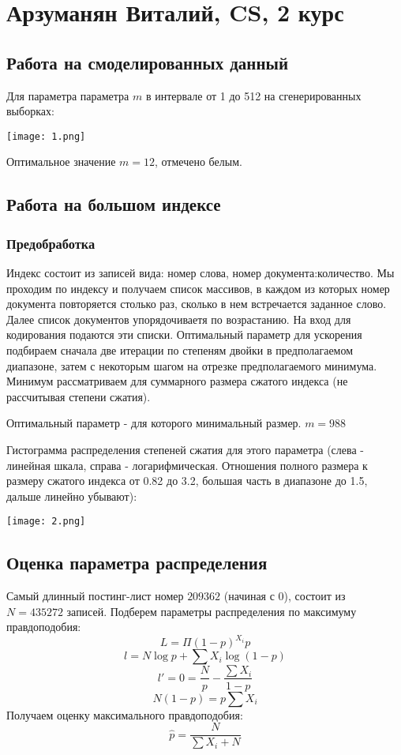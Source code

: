 \documentclass[12pt]{article}
\begin{document}
\section*{Арзуманян Виталий, CS, 2 курс}

\subsection*{Работа на смоделированных данный}
Для параметра параметра $m$ в интервале от 1 до 512 на сгенерированных выборках:

\texttt{[image: 1.png]}

Оптимальное значение $m=12$, отмечено белым.

\subsection*{Работа на большом индексе}

\subsubsection*{Предобработка}

Индекс состоит из записей вида: номер слова, номер документа:количество.
Мы проходим по индексу и получаем список массивов, в каждом из которых номер документа повторяется столько раз, сколько в нем встречается заданное слово. Далее список документов упорядочиваетя по возрастанию. На вход для кодирования подаются эти списки. Оптимальный параметр для ускорения подбираем сначала две итерации по степеням двойки в предполагаемом диапазоне, затем с некоторым шагом на отрезке предполагаемого минимума. Минимум рассматриваем для суммарного размера сжатого индекса (не рассчитывая степени сжатия).

Оптимальный параметр - для которого минимальный размер. $m = 988$

Гистограмма распределения степеней сжатия для этого параметра (слева - линейная шкала, справа - логарифмическая. Отношения полного размера к размеру сжатого индекса от 0.82 до 3.2, большая часть в диапазоне до 1.5, дальше линейно убывают):

\texttt{[image: 2.png]}



\subsection*{Оценка параметра распределения}

Самый длинный постинг-лист номер $209362$ (начиная с 0),  состоит из $N=435272$ записей.
Подберем параметры распределения по максимуму правдоподобия:
$$L = \Pi (1-p)^{X_i}p$$
$$l = N\log p + \sum X_i\log(1-p)$$
$$l' = 0 = \frac{N}{p} - \frac{\sum X_i}{1-p}$$
$$N(1-p) = p\sum X_i$$
Получаем оценку максимального правдоподобия:
$$\widehat{p} = \frac{N}{\sum X_i + N}$$
\end{document}

